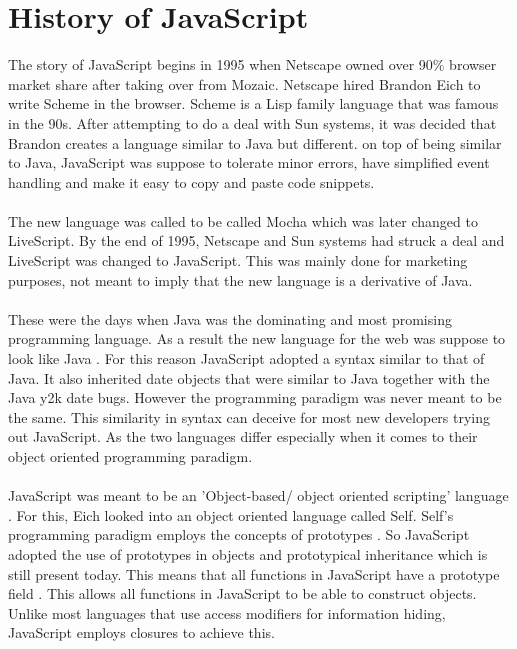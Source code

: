\section{History of JavaScript}
The story of JavaScript begins in 1995 when Netscape owned over 90\% browser market share after taking over from Mozaic. Netscape hired Brandon Eich to write Scheme in the browser. Scheme is a Lisp family language that was famous in the 90s\cite{findler_c}. After attempting to do a deal with Sun systems, it was decided that Brandon creates a language similar to Java but different. on top of being similar to Java, JavaScript was suppose to tolerate minor errors, have simplified event handling and make it easy to copy and paste code snippets.
\paragraph{}
The new language was called to be called Mocha which was later changed to LiveScript. By the end of 1995, Netscape and Sun systems had struck a deal and LiveScript was changed to JavaScript\cite{JS}. This was mainly done for marketing purposes, not meant to imply that the new language is a derivative of Java\cite{JS}. 
\paragraph{}
These were the days when Java was the dominating and most promising programming language. As a result the new language for the web was suppose to look like Java \cite{JS}. For this reason JavaScript adopted a syntax similar to that of Java. It also inherited date objects that were similar to Java together with the Java y2k date bugs\cite{Eich:2005:JTY:1090189.1086382}. However the programming paradigm was never meant to be the same. This similarity in syntax can deceive for most new developers trying out JavaScript. As the two languages differ especially when it comes to their object oriented programming paradigm.
\paragraph{}
JavaScript was meant to be an 'Object-based/ object oriented scripting' language \cite{Eich:2005:JTY:1090189.1086382}. For this, Eich looked into an object oriented language called Self. Self's programming paradigm employs the concepts of prototypes \cite{Ungar:1987:SPS:38807.38828}. So JavaScript adopted the use of prototypes in objects and prototypical inheritance which is still present today. This means that all functions in JavaScript have a prototype field \cite{Eich:2005:JTY:1090189.1086382}. This allows all functions in JavaScript to be able to construct objects. Unlike most languages that use access modifiers for information hiding, JavaScript employs closures to achieve this.
